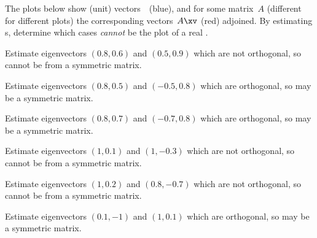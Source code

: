 \begin{example} 
The plots below show (unit) vectors~\xv\ (blue), and for some matrix~\(A\) (different for different plots) the corresponding vectors~\(A\xv\) (red) adjoined. 
By estimating s, determine which cases \emph{cannot} be the plot of a real .
\begin{Parts}

\item {}
\begin{solution} 
Estimate eigenvectors \((0.8,0.6)\) and \((0.5,0.9)\) which are not orthogonal, so cannot be from a symmetric matrix. 
\end{solution}


\item {}
\begin{solution} 
Estimate eigenvectors \((0.8,0.5)\) and \((-0.5,0.8)\) which are  orthogonal, so may be a symmetric matrix. 
\end{solution}


\item {}
\begin{solution} 
Estimate eigenvectors \((0.8,0.7)\) and \((-0.7,0.8)\) which are orthogonal, so may be a symmetric matrix. 
\end{solution}


\item {}
\begin{solution} 
Estimate eigenvectors \((1,0.1)\) and \((1,-0.3)\) which are not orthogonal, so cannot be from a symmetric matrix. 
\end{solution}

\begin{OmitV1}
\item {}
\begin{solution} 
Estimate eigenvectors \((1,0.2)\) and \((0.8,-0.7)\) which are not orthogonal, so cannot be from a symmetric matrix. 
\end{solution}

\item {}
\begin{solution} 
Estimate eigenvectors \((0.1,-1)\) and \((1,0.1)\) which are orthogonal, so may be a symmetric matrix. 
\end{solution}
\end{OmitV1}

\end{Parts}
\end{example}



